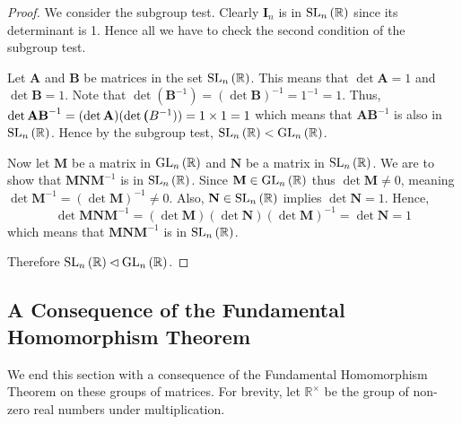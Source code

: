 \begin{proof}
    We consider the subgroup test. Clearly $\textbf{I}_n$ is in $\mathrm{SL}_{n}\left(\mathbb{R}\right)$ since its determinant is 1. Hence all we have to check the second condition of the subgroup test.

    Let \textbf{A} and \textbf{B} be matrices in the set $\mathrm{SL}_{n}\left(\mathbb{R}\right)$. This means that $\det \textbf{A} = 1$ and $\det \textbf{B} = 1$. Note that $\det(\textbf{B}^{-1}) = (\det \textbf{B})^{-1} = 1^{-1} = 1$. Thus, $\det \textbf{AB}^{-1} = (\det \textbf{A})(\det \textbf({B}^{-1})) = 1 \times 1  = 1$ which means that $\textbf{AB}^{-1}$ is also in $\mathrm{SL}_{n}\left(\mathbb{R}\right)$. Hence by the subgroup test, $\mathrm{SL}_{n}\left(\mathbb{R}\right) < \mathrm{GL}_{n}\left(\mathbb{R}\right)$.
    
    Now let $\textbf{M}$ be a matrix in $\mathrm{GL}_{n}\left(\mathbb{R}\right)$ and $\textbf{N}$ be a matrix in $\mathrm{SL}_{n}\left(\mathbb{R}\right)$. We are to show that $\textbf{MNM}^{-1}$ is in $\mathrm{SL}_{n}\left(\mathbb{R}\right)$. Since $\textbf{M} \in \mathrm{GL}_{n}\left(\mathbb{R}\right)$ thus $\det \textbf{M} \neq 0$, meaning $\det \textbf{M}^{-1} = (\det \textbf{M})^{-1} \neq 0$. Also, $\textbf{N} \in \mathrm{SL}_{n}\left(\mathbb{R}\right)$ implies $\det \textbf{N} = 1$. Hence,
    \[
        \det \textbf{MNM}^{-1} = (\det \textbf{M})(\det \textbf{N})(\det \textbf{M})^{-1} = \det \textbf{N} = 1
    \]
    which means that $\textbf{MNM}^{-1}$ is in $\mathrm{SL}_{n}\left(\mathbb{R}\right)$.

    Therefore $\mathrm{SL}_{n}\left(\mathbb{R}\right) \lhd \mathrm{GL}_{n}\left(\mathbb{R}\right)$.
\end{proof}

\subsection{A Consequence of the Fundamental Homomorphism Theorem}
We end this section with a consequence of the Fundamental Homomorphism Theorem on these groups of matrices. For brevity, let $\mathbb{R}^\times$ be the group of non-zero real numbers under multiplication.

